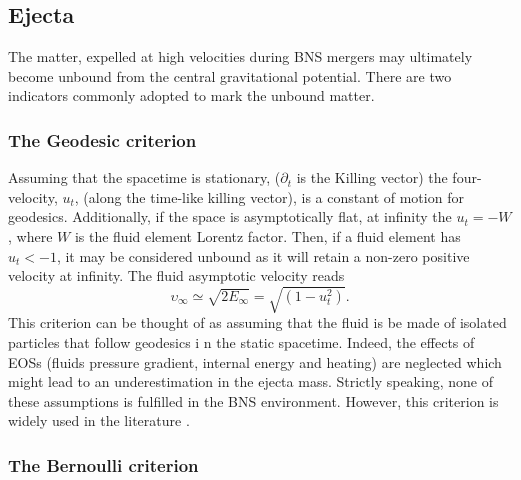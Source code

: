 \subsection{Ejecta} \label{sec:bns_sims:method:ejecta}

The matter, expelled at high velocities during \ac{BNS} mergers 
may ultimately become unbound from the 
central gravitational potential. 
There are two indicators commonly adopted to mark the unbound matter.

\subsubsection{The Geodesic criterion}

Assuming that the spacetime is stationary, ($\partial_t$ is the Killing vector) %
the four-velocity, $u_t$, (along the time-like killing vector), 
is a constant of motion for geodesics. 
Additionally, if the space is asymptotically flat, at infinity the $u_t = -W$, 
where $W$ is the fluid element Lorentz factor. 
Then, if a fluid element has $u_t < -1$, it may be considered unbound 
as it will retain a non-zero positive velocity at infinity. 
%
The fluid asymptotic velocity reads 
\begin{equation}
\upsilon_{\infty} \simeq \sqrt{2E_{\infty}} = \sqrt{(1-u_t ^2)}.
\end{equation}
%
This criterion can be thought of as assuming that the fluid 
is be made of isolated particles that follow geodesics i
n the static spacetime. Indeed, the effects of \acp{EOS} 
(fluids pressure gradient, internal energy and heating) %
are neglected which might lead to an 
underestimation in the ejecta mass. 
%
%
Strictly speaking, none of these assumptions is 
fulfilled in the \ac{BNS} \pmerg{} environment. However, this criterion 
is widely used in the literature 
\citep[\eg][]{Radice:2018pdn,Vincent:2019kor}.



\subsubsection{The Bernoulli criterion}

